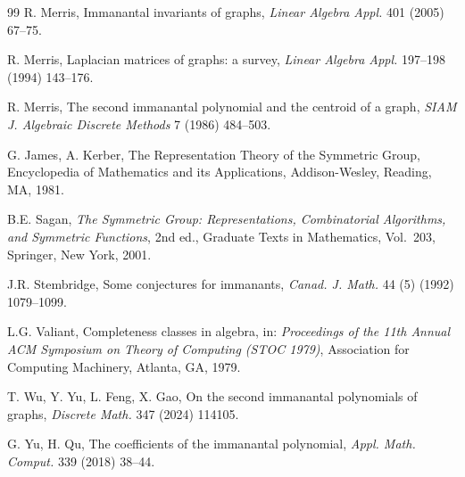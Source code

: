 \documentclass[11pt,a4paper]{article}
\begin{document}
\begin{thebibliography}{99}
R. Merris, Immanantal invariants of graphs, \textit{Linear Algebra Appl.} 401 (2005) 67--75.

R. Merris, Laplacian matrices of graphs: a survey, \textit{Linear Algebra Appl.} 197--198 (1994) 143--176.

R. Merris, The second immanantal polynomial and the centroid of a graph, \textit{SIAM J. Algebraic Discrete Methods} 7 (1986) 484--503.

G. James, A. Kerber, The Representation Theory of the Symmetric Group, Encyclopedia of Mathematics and its Applications,  Addison-Wesley, Reading, MA, 1981.

B.E. Sagan, \emph{The Symmetric Group: Representations, Combinatorial Algorithms, and Symmetric Functions}, 2nd ed., Graduate Texts in Mathematics, Vol.~203, Springer, New York, 2001.

J.R. Stembridge, Some conjectures for immanants, \textit{Canad. J. Math.} 44 (5) (1992) 1079--1099.




L.G. Valiant, Completeness classes in algebra, in: \emph{Proceedings of the 11th Annual ACM Symposium on Theory of Computing (STOC 1979)}, Association for Computing Machinery, Atlanta, GA, 1979.



 T. Wu, Y. Yu, L. Feng, X. Gao, On the second immanantal polynomials of graphs, \textit{Discrete Math.} 347 (2024) 114105.

 G. Yu, H. Qu, The coefficients of the immanantal polynomial, \textit{Appl. Math. Comput.} 339 (2018) 38--44.




\end{thebibliography}
\end{document}
